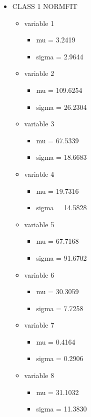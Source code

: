 \documentclass[a4paper]{article}
\begin{document}
\begin{itemize}
    
    \item CLASS 1 NORMFIT
    \begin{itemize}
        \item variable 1
        \begin{itemize}
            \item mu = 3.2419
            \item sigma = 2.9644
        \end{itemize}
        \item variable 2
        \begin{itemize}
            \item mu = 109.6254
            \item sigma = 26.2304
        \end{itemize}
        \item variable 3
        \begin{itemize}
            \item mu = 67.5339
            \item sigma = 18.6683
        \end{itemize}
        \item variable 4
        \begin{itemize}
            \item mu = 19.7316
            \item sigma = 14.5828
        \end{itemize}
        \item variable 5
        \begin{itemize}
            \item mu = 67.7168
            \item sigma = 91.6702
        \end{itemize}
        \item variable 6
        \begin{itemize}
            \item mu = 30.3059
            \item sigma = 7.7258
        \end{itemize}
        \item variable 7
        \begin{itemize}
            \item mu = 0.4164
            \item sigma = 0.2906
        \end{itemize}
        \item variable 8
        \begin{itemize}
            \item mu = 31.1032
            \item sigma = 11.3830
        \end{itemize}
    \end{itemize}
\end{itemize}
\end{document}
